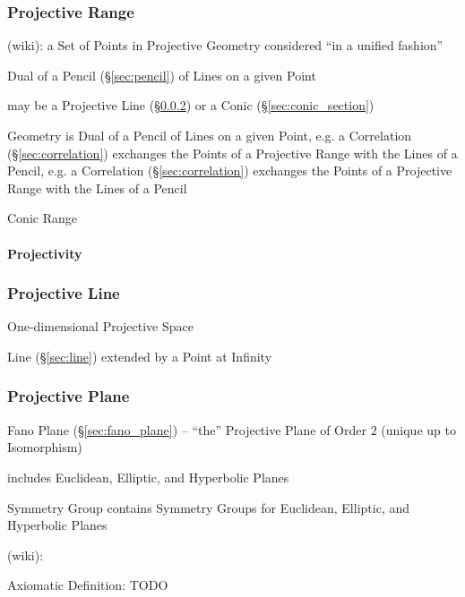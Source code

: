 \subsubsection{Projective Range}\label{sec:projective_range}

(wiki): a Set of Points in Projective Geometry considered ``in a unified
fashion''

Dual of a Pencil (\S\ref{sec:pencil}) of Lines on a given Point

may be a Projective Line (\S\ref{sec:projective_line}) or a Conic
(\S\ref{sec:conic_section})

Geometry is Dual of a Pencil of Lines on a given Point, e.g. a Correlation
(\S\ref{sec:correlation}) exchanges the Points of a Projective Range with the
Lines of a Pencil, e.g. a Correlation (\S\ref{sec:correlation}) exchanges the
Points of a Projective Range with the Lines of a Pencil

Conic Range



\paragraph{Projectivity}\label{sec:projectivity}\hfill



\subsubsection{Projective Line}\label{sec:projective_line}

One-dimensional Projective Space

Line (\S\ref{sec:line}) extended by a Point at Infinity



\subsubsection{Projective Plane}\label{sec:projective_plane}

Fano Plane (\S\ref{sec:fano_plane}) -- ``the'' Projective Plane of Order $2$
(unique up to Isomorphism)

includes Euclidean, Elliptic, and Hyperbolic Planes

Symmetry Group contains Symmetry Groups for Euclidean, Elliptic, and
Hyperbolic Planes

(wiki):

Axiomatic Definition: TODO



